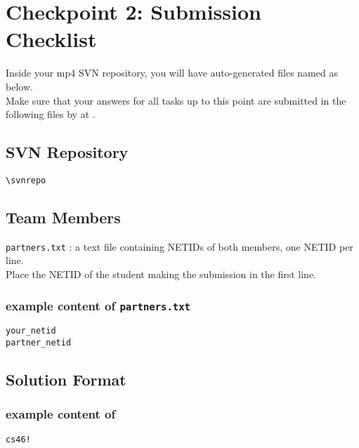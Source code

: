 \newpage

\section*{Checkpoint 2: Submission Checklist}
\label{sec:cp2checklist}

Inside your mp4 SVN repository, you will have auto-generated files named as below.\\
Make sure that your answers for all tasks up to this point are submitted in the following files by \textbf{\duedate} at \textbf{\duetime}.

\subsection*{SVN Repository}
\nolinkurl{\svnrepo}

\subsection*{Team Members}
\texttt{partners.txt} : a text file containing NETIDs of both members, one NETID per line.\\
Place the NETID of the student making the submission in the first line.
\vspace{-12pt}
\hypertarget{cp2partners}{}
\subsubsection*{example content of \texttt{partners.txt}}
\begin{mdframed}
\begin{Verbatim}
your_netid
partner_netid
\end{Verbatim}
\end{mdframed}

\subsection*{Solution Format}

\hypertarget{wepformat}{}
\subsubsection*{example content of \texttt{\hyperlink{cp2wep}{\filewep}}}
\begin{mdframed}
\begin{Verbatim}
cs46!
\end{Verbatim}
\end{mdframed}

